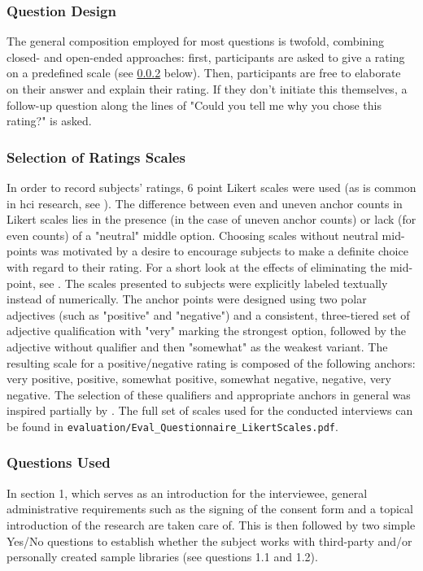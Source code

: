 \subsubsection{Question Design}
\label{subsubsec:question_design}
The general composition employed for most questions is twofold, combining
closed- and open-ended approaches: first, participants are asked to give a
rating on a predefined scale (see \ref{subsubsec:ratings_scales} below). Then,
participants are free to elaborate on their answer and explain their rating. If
they don't initiate this themselves, a follow-up question along the lines of
"Could you tell me why you chose this rating?" is asked.

\subsubsection{Selection of Ratings Scales}
\label{subsubsec:ratings_scales}
In order to record subjects' ratings, 6 point Likert scales were used (as is
common in \gls{hci} research, see \citet[p.31, p.93]{lazar2017}). The difference
between even and uneven anchor counts in Likert scales lies in the presence (in
the case of uneven anchor counts) or lack (for even counts) of a "neutral"
middle option. Choosing scales without neutral mid-points was motivated by a
desire to encourage subjects to make a definite choice with regard to their
rating. For a short look at the effects of eliminating the mid-point, see
\citet{garland1991}.
\smallskip
The scales presented to subjects were explicitly labeled textually instead of
numerically. The anchor points were designed using two polar adjectives (such as
"positive" and "negative") and a consistent, three-tiered set of adjective
qualification with "very" marking the strongest option, followed by the
adjective without qualifier and then "somewhat" as the weakest variant. The
resulting scale for a positive/negative rating is composed of the following
anchors: very positive, positive, somewhat positive, somewhat negative,
negative, very negative. The selection of these qualifiers and appropriate
anchors in general was inspired partially by \citet{vagias2006}. The full set of
scales used for the conducted interviews can be found in
\texttt{evaluation/Eval\_Questionnaire\_LikertScales.pdf}.

\subsubsection{Questions Used}
\label{subsubsec:questions_used}
In section 1, which serves as an introduction for the interviewee, general
administrative requirements such as the signing of the consent form and a
topical introduction of the research are taken care of. This is then followed
by two simple Yes/No questions to establish whether the subject works with
third-party and/or personally created sample libraries (see questions 1.1 and
1.2).

